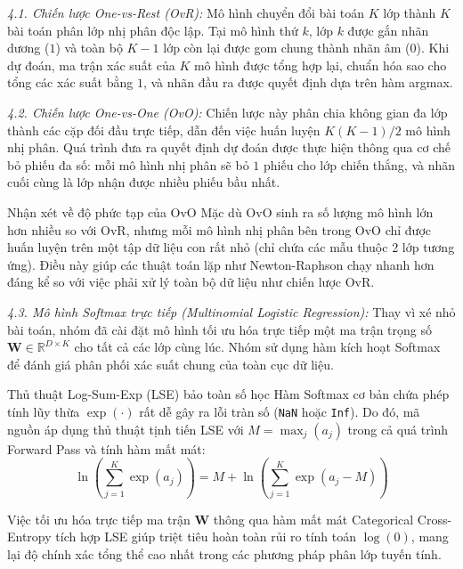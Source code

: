 \noindent\textcolor{infocolor}{\textit{4.1. Chiến lược One-vs-Rest (OvR):}}
Mô hình chuyển đổi bài toán $K$ lớp thành $K$ bài toán phân lớp nhị phân độc lập. Tại mô hình thứ $k$, lớp $k$ được gắn nhãn dương ($1$) và toàn bộ $K-1$ lớp còn lại được gom chung thành nhãn âm ($0$). Khi dự đoán, ma trận xác suất của $K$ mô hình được tổng hợp lại, chuẩn hóa sao cho tổng các xác suất bằng $1$, và nhãn đầu ra được quyết định dựa trên hàm argmax.

\noindent\textcolor{infocolor}{\textit{4.2. Chiến lược One-vs-One (OvO):}}
Chiến lược này phân chia không gian đa lớp thành các cặp đối đầu trực tiếp, dẫn đến việc huấn luyện $K(K-1)/2$ mô hình nhị phân. Quá trình đưa ra quyết định dự đoán được thực hiện thông qua cơ chế bỏ phiếu đa số: mỗi mô hình nhị phân sẽ bỏ $1$ phiếu cho lớp chiến thắng, và nhãn cuối cùng là lớp nhận được nhiều phiếu bầu nhất.

\begin{notebox}{Nhận xét về độ phức tạp của OvO}
Mặc dù OvO sinh ra số lượng mô hình lớn hơn nhiều so với OvR, nhưng mỗi mô hình nhị phân bên trong OvO chỉ được huấn luyện trên một tập dữ liệu con rất nhỏ (chỉ chứa các mẫu thuộc 2 lớp tương ứng). Điều này giúp các thuật toán lặp như Newton-Raphson chạy nhanh hơn đáng kể so với việc phải xử lý toàn bộ dữ liệu như chiến lược OvR.
\end{notebox}

\noindent\textcolor{infocolor}{\textit{4.3. Mô hình Softmax trực tiếp (Multinomial Logistic Regression):}}
Thay vì xé nhỏ bài toán, nhóm đã cài đặt mô hình tối ưu hóa trực tiếp một ma trận trọng số $\mathbf{W} \in \mathbb{R}^{D \times K}$ cho tất cả các lớp cùng lúc. Nhóm sử dụng hàm kích hoạt Softmax để đánh giá phân phối xác suất chung của toàn cục dữ liệu. 

\begin{infobox}{Thủ thuật Log-Sum-Exp (LSE) bảo toàn số học}
Hàm Softmax cơ bản chứa phép tính lũy thừa $\exp(\cdot)$ rất dễ gây ra lỗi tràn số (\texttt{NaN} hoặc \texttt{Inf}). Do đó, mã nguồn áp dụng thủ thuật tịnh tiến LSE với $M = \max_j(a_j)$ trong cả quá trình Forward Pass và tính hàm mất mát:
\begin{equation}
    \ln\left(\sum_{j=1}^K \exp(a_j)\right) = M + \ln\left(\sum_{j=1}^K \exp(a_j - M)\right)
\end{equation}
\end{infobox}

Việc tối ưu hóa trực tiếp ma trận $\mathbf{W}$ thông qua hàm mất mát Categorical Cross-Entropy tích hợp LSE giúp triệt tiêu hoàn toàn rủi ro tính toán $\log(0)$, mang lại độ chính xác tổng thể cao nhất trong các phương pháp phân lớp tuyến tính.

